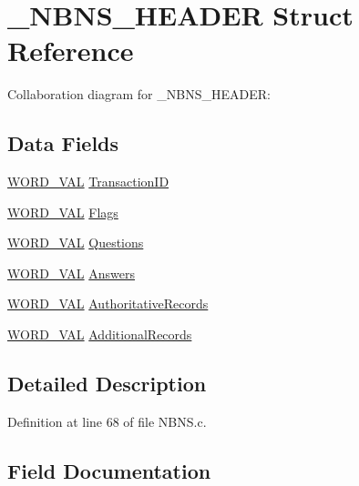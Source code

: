 \hypertarget{struct___n_b_n_s___h_e_a_d_e_r}{}\section{\+\_\+\+N\+B\+N\+S\+\_\+\+H\+E\+A\+D\+E\+R Struct Reference}
\label{struct___n_b_n_s___h_e_a_d_e_r}


Collaboration diagram for \+\_\+\+N\+B\+N\+S\+\_\+\+H\+E\+A\+D\+E\+R\+:
\subsection*{Data Fields}
\begin{DoxyCompactItemize}
\item 
\hyperlink{union_w_o_r_d___v_a_l}{W\+O\+R\+D\+\_\+\+V\+A\+L} \hyperlink{struct___n_b_n_s___h_e_a_d_e_r_a5a0dfb5b1d8d29e0a0be61eeaae10de1}{Transaction\+I\+D}
\item 
\hyperlink{union_w_o_r_d___v_a_l}{W\+O\+R\+D\+\_\+\+V\+A\+L} \hyperlink{struct___n_b_n_s___h_e_a_d_e_r_ad98e1410704c98e4e781e5a0d41ecdf3}{Flags}
\item 
\hyperlink{union_w_o_r_d___v_a_l}{W\+O\+R\+D\+\_\+\+V\+A\+L} \hyperlink{struct___n_b_n_s___h_e_a_d_e_r_afecf1635048108f6024d67f09c6cb96d}{Questions}
\item 
\hyperlink{union_w_o_r_d___v_a_l}{W\+O\+R\+D\+\_\+\+V\+A\+L} \hyperlink{struct___n_b_n_s___h_e_a_d_e_r_ab336db123574d581aa20bb3351ab9df4}{Answers}
\item 
\hyperlink{union_w_o_r_d___v_a_l}{W\+O\+R\+D\+\_\+\+V\+A\+L} \hyperlink{struct___n_b_n_s___h_e_a_d_e_r_a32062e343da3fba14e47d53f5681befa}{Authoritative\+Records}
\item 
\hyperlink{union_w_o_r_d___v_a_l}{W\+O\+R\+D\+\_\+\+V\+A\+L} \hyperlink{struct___n_b_n_s___h_e_a_d_e_r_ae27a76434a557cec2b8e1e1d8063623f}{Additional\+Records}
\end{DoxyCompactItemize}


\subsection{Detailed Description}


Definition at line 68 of file N\+B\+N\+S.\+c.



\subsection{Field Documentation}
\hypertarget{struct___n_b_n_s___h_e_a_d_e_r_ae27a76434a557cec2b8e1e1d8063623f}{}
